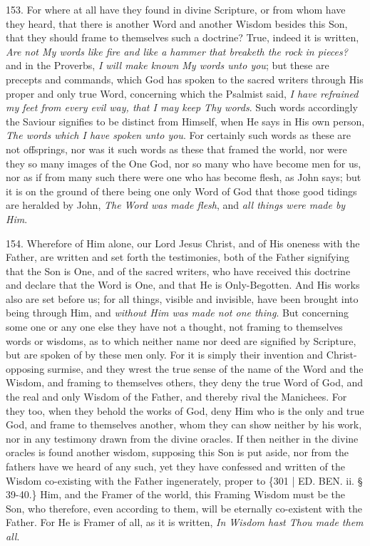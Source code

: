 153. For where at all have
they found in divine Scripture, or from whom have they heard, that
there is another Word and another Wisdom besides this Son, that they
should frame to themselves such a doctrine? True, indeed it is
written, \emph{Are not My words like fire and like a hammer that breaketh
the rock in pieces?} and in the Proverbs, \emph{I will make known My
words unto you}; but these are precepts and commands, which God has
spoken to the sacred writers through His proper and only true Word,
concerning which the Psalmist said, \emph{I have refrained my feet from
every evil way, that I may keep Thy words}. Such words accordingly the Saviour signifies to be distinct from Himself, when He
says in His own person, \emph{The words which I have spoken unto you}.
For certainly such words as these are not offsprings, nor was it such
words as these that framed the world, nor were they so many images of
the One God, nor so many who have become men for us, nor as if from
many such there were one who has become flesh, as John says; but it is
on the ground of there being one only Word of God that those good
tidings are heralded by John, \emph{The Word was made flesh}, and \emph{all
things were made by Him}.

154. Wherefore of Him alone,
our Lord Jesus Christ, and of His oneness with the Father, are written
and set forth the testimonies, both of the Father signifying that the
Son is One, and of the sacred writers, who have received this doctrine
and declare that the Word is One, and that He is Only-Begotten. And
His works also are set before us; for all things, visible and
invisible, have been brought into being through Him, and \emph{without
Him was made not one thing}. But concerning some one or any one
else they have not a thought, not framing to themselves words or
wisdoms, as to which neither name nor deed are signified by Scripture,
but are spoken of by these men only. For it is simply their invention
and Christ-opposing surmise, and they wrest the true sense of the name
of the Word and the Wisdom, and framing to themselves others, they
deny the true Word of God, and the real and only Wisdom of the Father,
and thereby rival the Manichees. For they too, when they behold the
works of God, deny Him who is the only and true God, and frame to
themselves another, whom they can show neither by his work, nor in any
testimony drawn from the divine oracles. If then neither in the divine
oracles is found another wisdom, supposing this Son is put aside, nor
from the fathers have we heard of any such, yet they have confessed
and written of the Wisdom co-existing with the Father ingenerately,
proper to \{301 | ED.
BEN. ii. § 39-40.\} Him, and the Framer of the
world, this Framing Wisdom must be the Son, who therefore, even
according to them, will be eternally co-existent with the Father. For
He is Framer of all, as it is written, \emph{In Wisdom hast Thou made
them all}.

